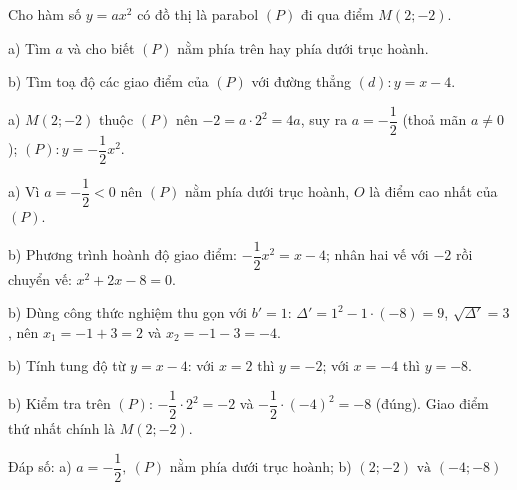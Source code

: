 \begin{problem}[9DS-HSB2-006]
Cho hàm số $y = ax^2$ có đồ thị là parabol $(P)$ đi qua điểm $M(2; -2)$.

a) Tìm $a$ và cho biết $(P)$ nằm phía trên hay phía dưới trục hoành.

b) Tìm toạ độ các giao điểm của $(P)$ với đường thẳng $(d)\colon y = x - 4$.

\begin{solution}
a) $M(2; -2)$ thuộc $(P)$ nên $-2 = a \cdot 2^2 = 4a$, suy ra $a = -\dfrac{1}{2}$ (thoả mãn $a \neq 0$); $(P)\colon y = -\dfrac{1}{2}x^2$.

a) Vì $a = -\dfrac{1}{2} < 0$ nên $(P)$ nằm phía dưới trục hoành, $O$ là điểm cao nhất của $(P)$.

b) Phương trình hoành độ giao điểm: $-\dfrac{1}{2}x^2 = x - 4$; nhân hai vế với $-2$ rồi chuyển vế: $x^2 + 2x - 8 = 0$.

b) Dùng công thức nghiệm thu gọn với $b' = 1$: $\Delta' = 1^2 - 1 \cdot (-8) = 9$, $\sqrt{\Delta'} = 3$, nên $x_1 = -1 + 3 = 2$ và $x_2 = -1 - 3 = -4$.

b) Tính tung độ từ $y = x - 4$: với $x = 2$ thì $y = -2$; với $x = -4$ thì $y = -8$.

b) Kiểm tra trên $(P)$: $-\dfrac{1}{2} \cdot 2^2 = -2$ và $-\dfrac{1}{2} \cdot (-4)^2 = -8$ (đúng). Giao điểm thứ nhất chính là $M(2; -2)$.

Đáp số: a) $\boxed{a = -\dfrac{1}{2},\ (P) \text{ nằm phía dưới trục hoành}}$; b) $\boxed{(2; -2) \text{ và } (-4; -8)}$
\end{solution}
\end{problem}

